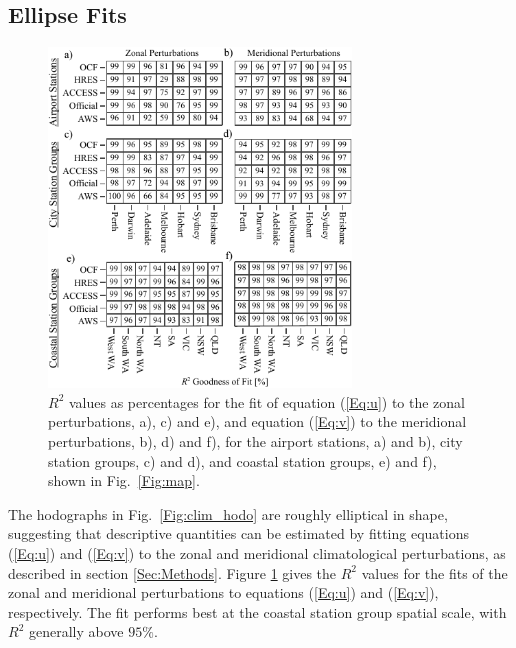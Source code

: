 \documentclass[twocol]{ametsoc}
\begin{document}
\subsection{Ellipse Fits}

\begin{figure}
\centering
\includegraphics[width=19pc]{r_squared.pdf}
\caption{$R^2$ values as percentages for the fit of equation (\ref{Eq:u}) to the zonal perturbations, a), c) and e), and equation (\ref{Eq:v}) to the meridional perturbations, b), d) and f), for the airport stations, a) and b), city station groups, c) and d), and coastal station groups, e) and f), shown in Fig.~\ref{Fig:map}.}
\label{Fig:r_squared}
\end{figure}

The hodographs in Fig.~\ref{Fig:clim_hodo} are roughly elliptical in shape, suggesting that descriptive quantities can be estimated by fitting equations (\ref{Eq:u}) and (\ref{Eq:v}) to the zonal and meridional climatological perturbations, as described in section \ref{Sec:Methods}. Figure \ref{Fig:r_squared} gives the $R^2$ values for the fits of the zonal and meridional perturbations to equations (\ref{Eq:u}) and (\ref{Eq:v}), respectively. The fit performs best at the coastal station group spatial scale, with $R^2$ generally above $95\%$. 
\end{document}
